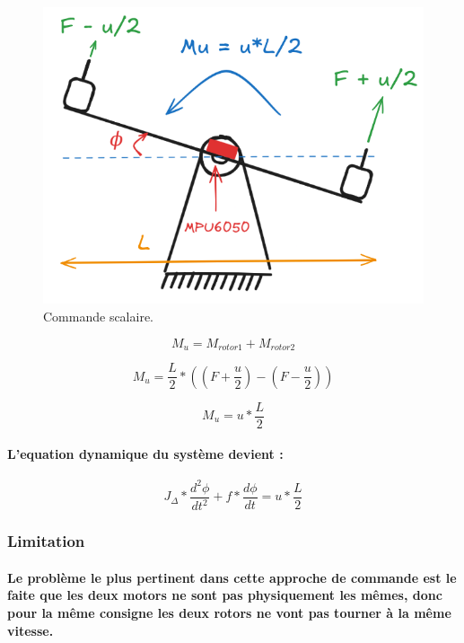 \paragraph*{}
\begin{figure}[!htpb]
	\centering
	\includegraphics[width=0.8\linewidth]{Figures/Mu.png}
	\caption{Commande scalaire.}
\end{figure}

\begin{equation}
	M_u = M_{rotor1} + M_{rotor2}
\end{equation}

\begin{equation}
	M_u = \frac{L}{2} * ((F + \frac{u}{2}) - (F - \frac{u}{2}))
\end{equation}

\begin{equation}
	M_u = u * \frac{L}{2}
\end{equation}

\paragraph{L'equation dynamique du système devient :}
\begin{equation}
	J_\Delta * \frac{d^2\phi}{dt^2} + f * \frac{d\phi}{dt} = u * \frac{L}{2}
\end{equation}

\subsubsection{Limitation}

\paragraph{Le problème le plus pertinent dans cette approche de commande est le faite que les deux motors ne sont pas physiquement les mêmes, donc pour la même consigne les deux rotors ne vont pas tourner à la même vitesse.}


